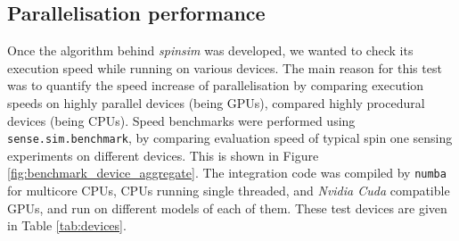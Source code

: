 \documentclass{jors}
\begin{document}
	\subsection{Parallelisation performance}
		Once the algorithm behind \emph{spinsim} was developed, we wanted to check its execution speed while running on various devices.
		The main reason for this test was to quantify the speed increase of parallelisation by comparing execution speeds on highly parallel devices (being GPUs), compared highly procedural devices (being CPUs).
		Speed benchmarks were performed using \texttt{sense.sim.benchmark}, by comparing evaluation speed of typical spin one sensing experiments on different devices.
		This is shown in Figure \ref{fig:benchmark_device_aggregate}.
		The integration code was compiled by \texttt{numba} for multicore CPUs, CPUs running single threaded, and \emph{Nvidia Cuda} compatible GPUs, and run on different models of each of them.
		These test devices are given in Table \ref{tab:devices}.
\end{document}
